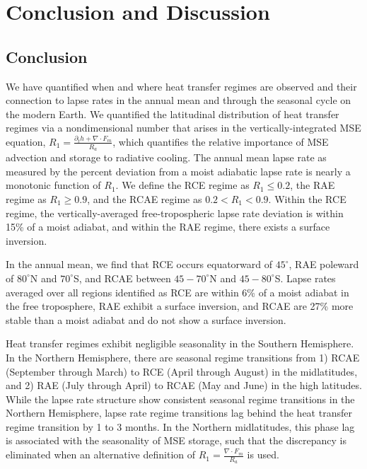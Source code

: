 \documentclass{ametsocV5}
\begin{document}
\section{Conclusion and Discussion}

\subsection{Conclusion}
We have quantified when and where heat transfer regimes are observed and their connection to lapse rates in the annual mean and through the seasonal cycle on the modern Earth. We quantified the latitudinal distribution of heat transfer regimes via a nondimensional number that arises in the vertically-integrated MSE equation, $R_1=\frac{\partial_t h + \nabla\cdot F_m}{R_a}$, which quantifies the relative importance of MSE advection and storage to radiative cooling. The annual mean lapse rate as measured by the percent deviation from a moist adiabatic lapse rate is nearly a monotonic function of $R_1$. We define the RCE regime as $R_1 \le 0.2$, the RAE regime as $R_1 \ge 0.9$, and the RCAE regime as $0.2 < R_1 < 0.9$. Within the RCE regime, the vertically-averaged free-tropospheric lapse rate deviation is within 15\% of a moist adiabat, and within the RAE regime, there exists a surface inversion.

In the annual mean, we find that RCE occurs equatorward of $45^\circ$, RAE poleward of $80^\circ$N and $70^\circ$S, and RCAE between $45-70^\circ$N and $45-80^\circ$S. Lapse rates averaged over all regions identified as RCE are within 6\% of a moist adiabat in the free troposphere, RAE exhibit a surface inversion, and RCAE are 27\% more stable than a moist adiabat and do not show a surface inversion.

Heat transfer regimes exhibit negligible seasonality in the Southern Hemisphere. In the Northern Hemisphere, there are seasonal regime transitions from 1) RCAE (September through March) to RCE (April through August) in the midlatitudes, and 2) RAE (July through April) to RCAE (May and June) in the high latitudes. While the lapse rate structure show consistent seasonal regime transitions in the Northern Hemisphere, lapse rate regime transitions lag behind the heat transfer regime transition by 1 to 3 months. In the Northern midlatitudes, this phase lag is associated with the seasonality of MSE storage, such that the discrepancy is eliminated when an alternative definition of $R_1=\frac{\nabla\cdot F_m}{R_a}$ is used.
\end{document}
